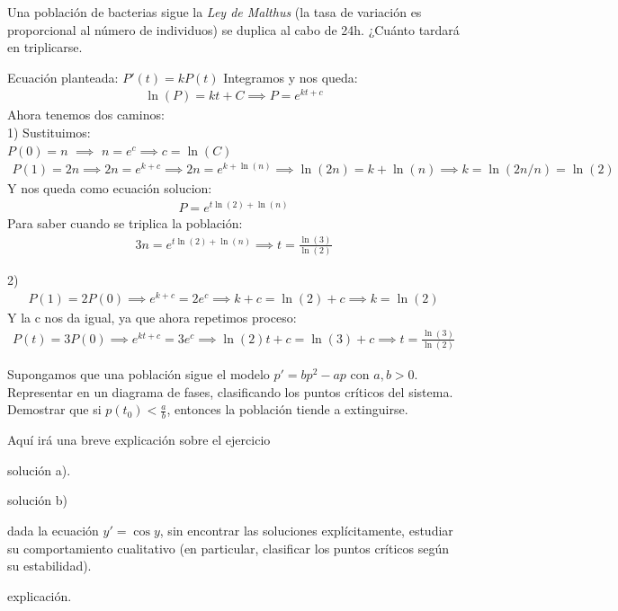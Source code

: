 \documentclass[nochap]{apuntes}
\begin{document}
\newpage
\begin{problem}[19]
Una población de bacterias sigue la \textit{Ley de Malthus} (la tasa de variación es proporcional al número de individuos) se duplica al cabo de 24h. ¿Cuánto tardará en triplicarse.
\solution
\begin{expla}
\end{expla}
Ecuación planteada: $P'(t)=kP(t)$
Integramos y nos queda: 
\begin{gather*}
\ln(P)=kt+C \implies P=e^{kt+c}
\end{gather*}
Ahora tenemos dos caminos:\\
1) Sustituimos:\\
$P(0)=n$ $\implies$ $n=e^c \implies c=\ln(C) $
\begin{gather*}
P(1)=2n \implies 2n=e^{k+c} \implies 2n=e^{k+\ln(n)} \implies \ln(2n)=k+\ln(n) \implies k=\ln(2n/n)=\ln(2)
\end{gather*}
Y nos queda como ecuación solucion:
\begin{gather*}
P= e^{t\ln(2)+\ln(n)}
\end{gather*}
Para saber cuando se triplica la población:
\begin{gather*}
3n= e^{t\ln(2)+\ln(n)} \implies t=\frac{\ln(3)}{\ln(2)}
\end{gather*}

2)
\begin{gather*}
P(1)=2P(0) \implies e^{k+c}=2e^c \implies k+c=\ln(2)+c \implies k=\ln(2)
\end{gather*}
Y la c nos da igual, ya que ahora repetimos proceso:
\begin{gather*}
P(t)=3P(0) \implies e^{kt+c}=3e^c \implies \ln(2)t+c=\ln(3)+c \implies t=\frac{\ln(3)}{\ln(2)}
\end{gather*}
\end{problem}
\newpage
\begin{problem}[20]
Supongamos que una población sigue el modelo $p'=bp^2-ap$ con $a,b>0$.
\ppart
Representar en un diagrama de fases, clasificando los puntos críticos del sistema.
\ppart
Demostrar que si $p(t_0)<\frac{a}{b} $, entonces la población tiende a extinguirse.

\solution

\begin{expla}
Aquí irá una breve explicación sobre el ejercicio
\end{expla}

\spart
solución a).

\spart
solución b)

\end{problem}
\newpage
\begin{problem}[21]
dada la ecuación $y'=\cos y$, sin encontrar las soluciones explícitamente, estudiar su comportamiento cualitativo (en particular, clasificar los puntos críticos según su estabilidad).
\solution
\begin{expla}
explicación.
\end{expla}
\end{problem}
\end{document}
